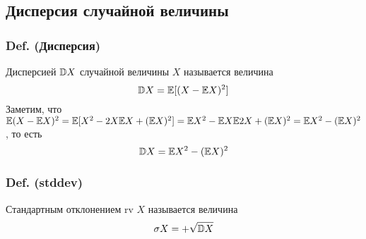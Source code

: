 \subsection{Дисперсия случайной
величины}\label{ux434ux438ux441ux43fux435ux440ux441ux438ux44f-ux441ux43bux443ux447ux430ux439ux43dux43eux439-ux432ux435ux43bux438ux447ux438ux43dux44b}

\subsubsection{Def.
(Дисперсия)}\label{def.-ux434ux438ux441ux43fux435ux440ux441ux438ux44f}

Дисперсией \(\mathbb D X\) случайной величины \(X\) называется величина
\[ \mathbb D X = \mathbb E [(X - \mathbb E X)^2]\] Заметим, что
\(\mathbb E (X-\mathbb E X)^2 = \mathbb E [X^2 - 2X\mathbb E X + (\mathbb E X)^2] = \mathbb E X^2 - \mathbb E X \mathbb E 2X + (\mathbb E X)^2 = \mathbb E X^2 - (\mathbb E X)^2\),
то есть \[ \mathbb D X = \mathbb E X^2 - (\mathbb E X)^2 \]

\subsubsection{Def. (stddev)}\label{def.-stddev}

Стандартным отклонением rv \(X\) называется величина
\[\sigma X = +\sqrt{\mathbb D X}\]
